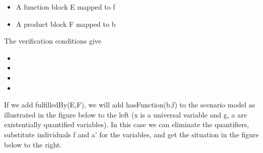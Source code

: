 \begin{itemize}
  \item A function block E mapped to f
  \item A product block F mapped to b
\end{itemize}
The verification conditions give

\begin{itemize}
  \item  \item  \item  \item\end{itemize}
If we add fulfilledBy(E,F), we will add hasFunction(b,f) to the scenario model as illustrated in the figure below to
the left (x is a universal variable and g, a are existentially quantified variables). In this case we can eliminate
the quantifiers, substitute individuals f and a' for the variables, and get the situation in the figure below to the
right.

